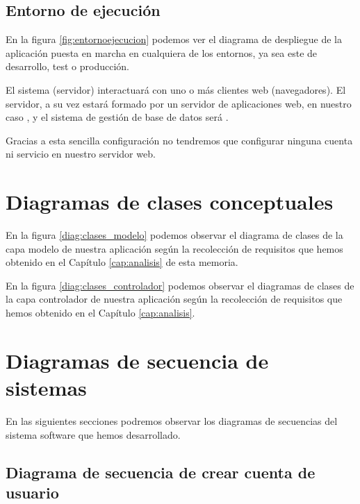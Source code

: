 \subsection{Entorno de ejecución}
En la figura \ref{fig:entornoejecucion} podemos ver el diagrama de despliegue de
la aplicación puesta en marcha en cualquiera de los entornos, ya sea este de
desarrollo, test o producción.

El sistema (servidor) interactuará con uno o más clientes web (navegadores). El
servidor, a su vez estará formado por un servidor de aplicaciones web, en
nuestro caso , y el sistema de gestión de base de datos será
.

Gracias a esta sencilla configuración no tendremos que configurar ninguna cuenta
ni servicio en nuestro servidor web.

\clearpage
\section{Diagramas de clases conceptuales}
En la figura \ref{diag:clases_modelo} podemos observar el diagrama de clases de
la capa modelo de nuestra aplicación según la recolección de requisitos que
hemos obtenido en el Capítulo \ref{cap:analisis} de esta memoria.


\clearpage

En la figura \ref{diag:clases_controlador} podemos observar el diagramas de
clases de la capa controlador de nuestra aplicación según la recolección de
requisitos que hemos obtenido en el Capítulo \ref{cap:analisis}.


\section{Diagramas de secuencia de sistemas}

En las siguientes secciones podremos observar los diagramas de secuencias del
sistema software que hemos desarrollado.

\subsection{Diagrama de secuencia de crear cuenta de usuario}

